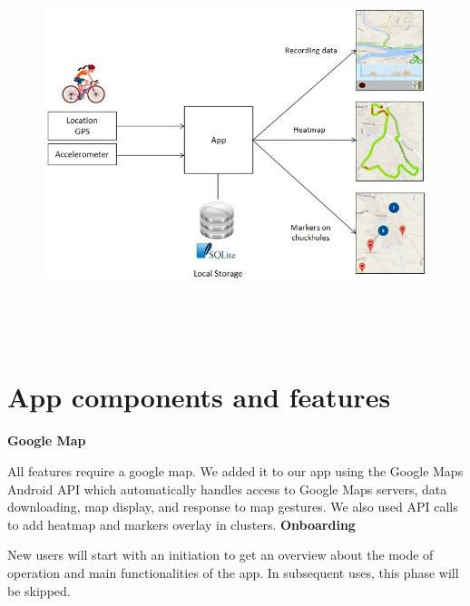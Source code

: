 \documentclass[10pt,a4paper]{article} %
\begin{document}
	\begin{figure}[H]
	\centering
    \includegraphics[width=15cm, height=11.5cm]{pic1}
    \end{figure}
    
    
    
    
    \section{App components and features}
    
    \textbf{Google Map}
    
    All features require a google map. We added it to our app using the Google Maps Android API which automatically handles access to Google Maps servers, data downloading, map display, and response to map gestures. 
    We also used API calls to add heatmap and markers overlay in clusters.
    \textbf{Onboarding}
    
    New users will start with an initiation to get an overview about the mode of operation and main functionalities of the app. In subsequent uses, this phase will be skipped.
    
    
    
\end{document}
